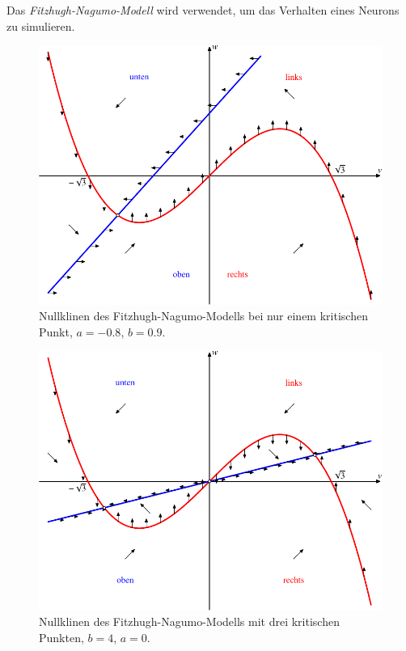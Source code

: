 \begin{beispiel}
Das {\em Fitzhugh-Nagumo-Modell} wird verwendet, um das Verhalten eines Neurons
zu simulieren.
\begin{figure}
\centering
\includegraphics{chapters/images/nullklinen-5.pdf}
\caption{Nullklinen des Fitzhugh-Nagumo-Modells bei nur einem kritischen Punkt,
$a=-0.8$, $b=0.9$.
\label{geometrie:nullklinen-fh-1}}
\end{figure}
\begin{figure}
\centering
\includegraphics{chapters/images/nullklinen-6.pdf}
\caption{Nullklinen des Fitzhugh-Nagumo-Modells mit drei kritischen Punkten,
$b=4$, $a=0$.
\label{geometrie:nullklinen-fh-2}}

\end{figure}
\end{beispiel}
